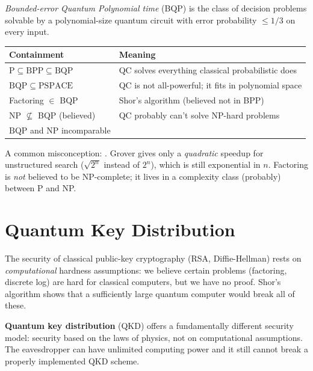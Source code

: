 \documentclass[oneside]{academica}
\begin{document}
\begin{definition*}[BQP]
  \emph{Bounded-error Quantum Polynomial time} (BQP) is the class of decision problems solvable by a polynomial-size quantum circuit with error probability $\le1/3$ on every input.
\end{definition*}

\begin{center}
  \renewcommand{\arraystretch}{1.2}
  \begin{tabular}{l|l}
    \textbf{Containment} & \textbf{Meaning} \\
    \hline
    $\mathrm{P}\subseteq\mathrm{BPP}\subseteq\mathrm{BQP}$ & QC solves everything classical probabilistic does \\
    $\mathrm{BQP}\subseteq\mathrm{PSPACE}$ & QC is not all-powerful; it fits in polynomial space \\
    Factoring $\in$ BQP & Shor's algorithm (believed not in BPP) \\
    NP $\not\subseteq$ BQP (believed) & QC probably can't solve NP-hard problems \\
    $\mathrm{BQP}$ and NP incomparable\footnotemark & \\
  \end{tabular}
\end{center}
\begin{note}
  A common misconception: .
  Grover gives only a \emph{quadratic} speedup for unstructured search ($\sqrt{2^n}$ instead of $2^n$), which is still exponential in $n$.
  Factoring is \emph{not} believed to be NP-complete; it lives in a complexity class (probably) between P and NP.
\end{note}

\chapter{Quantum Key Distribution}

The security of classical public-key cryptography (RSA, Diffie-Hellman) rests on \emph{computational} hardness assumptions: we believe certain problems (factoring, discrete log) are hard for classical computers, but we have no proof.
Shor's algorithm shows that a sufficiently large quantum computer would break all of these.

\textbf{Quantum key distribution} (QKD) offers a fundamentally different security model: security based on the laws of physics, not on computational assumptions.
The eavesdropper can have unlimited computing power and it still cannot break a properly implemented QKD scheme.
\end{document}
